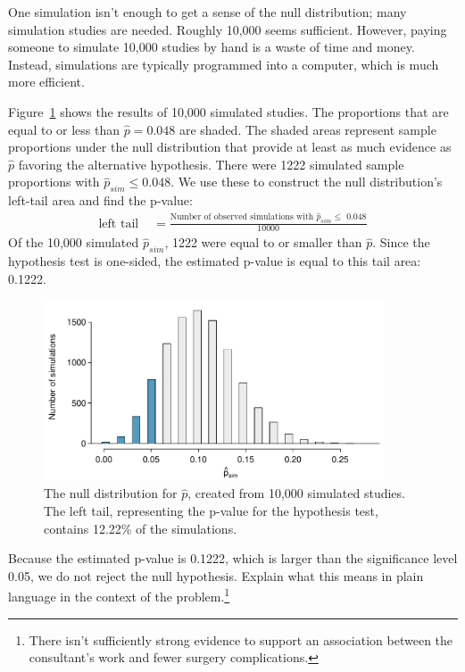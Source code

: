 One simulation isn't enough to get a sense of the null distribution; many simulation studies are needed. Roughly 10,000 seems sufficient. However, paying someone to simulate 10,000 studies by hand is a waste of time and money. Instead, simulations are typically programmed into a computer, which is much more efficient.

Figure~\ref{nullDistForPHatIfLiverTransplantConsultantIsNotHelpful} shows the results of 10,000 simulated studies. The proportions that are equal to or less than $\hat{p}=0.048$ are shaded. The shaded areas represent sample proportions under the null distribution that provide at least as much evidence as $\hat{p}$ favoring the alternative hypothesis. There were 1222 simulated sample proportions with $\hat{p}_{sim} \leq 0.048$. We use these to construct the null distribution's left-tail area and find the p-value:
\begin{align}
\text{left tail }\label{estOfPValueBasedOnSimulatedNullForSingleProportion}
	&= \frac{\text{Number of observed simulations with }\hat{p}_{sim}\leq\text{ 0.048}}{10000}
\end{align}
Of the 10,000 simulated $\hat{p}_{sim}$, 1222 were equal to or smaller than $\hat{p}$. Since the hypothesis test is one-sided, the estimated p-value is equal to this tail area: 0.1222.
\begin{figure}
\centering
\includegraphics[width=0.9\textwidth]{ch_inference_for_props/figures/nullDistForPHatIfLiverTransplantConsultantIsNotHelpful/nullDistForPHatIfLiverTransplantConsultantIsNotHelpful}
\caption{The null distribution for $\hat{p}$, created from 10,000 simulated studies. The left tail, representing the p-value for the hypothesis test, contains 12.22\% of the simulations.}
\label{nullDistForPHatIfLiverTransplantConsultantIsNotHelpful}
\end{figure}

\begin{exercise} \label{plainLanguageExplanationOfHTConclusionForLiverDonorSurgicalConsultant}
Because the estimated p-value is 0.1222, which is larger than the significance level 0.05, we do not reject the null hypothesis. Explain what this means in plain language in the context of the problem.\footnote{There isn't sufficiently strong evidence to support an association between the consultant's work and fewer surgery complications.}
\end{exercise}

